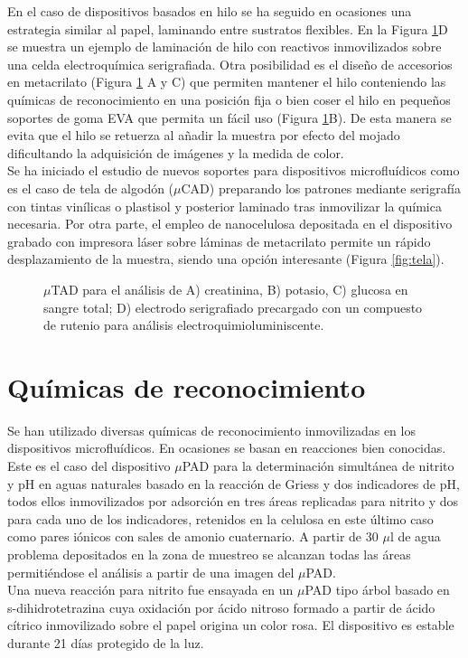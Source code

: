 \documentclass{article}
\begin{document}
En el caso de dispositivos basados en hilo se ha seguido en ocasiones una estrategia similar al papel, laminando entre sustratos flexibles. En la Figura \ref{fig:hilo}D se muestra un ejemplo de laminación de hilo con reactivos inmovilizados sobre una celda electroquímica serigrafiada. Otra posibilidad es el diseño de accesorios en metacrilato (Figura \ref{fig:hilo} A y C) que permiten mantener el hilo conteniendo las químicas de reconocimiento en una posición fija o bien coser el hilo en pequeños soportes de goma EVA que permita un fácil uso (Figura \ref{fig:hilo}B). De esta manera se evita que el hilo se retuerza al añadir la muestra por efecto del mojado dificultando la adquisición de imágenes y la medida de color.\\

Se ha iniciado el estudio de nuevos soportes para dispositivos microfluídicos como es el caso de tela de algodón ($\mu$CAD) preparando los patrones mediante serigrafía con tintas vinílicas o plastisol y posterior laminado tras inmovilizar la química necesaria. Por otra parte, el empleo de nanocelulosa depositada en el dispositivo grabado con impresora láser sobre láminas de metacrilato permite un rápido desplazamiento de la muestra, siendo una opción interesante (Figura \ref{fig:tela}).\\

\begin{figure}[h]
\caption{ $\mu$TAD para el análisis de A) creatinina, B) potasio, C) glucosa en sangre total; D) electrodo serigrafiado precargado con un compuesto de rutenio para análisis electroquimioluminiscente.}
\label{fig:hilo}
\end{figure}

\section{Químicas de reconocimiento}
Se han utilizado diversas químicas de reconocimiento inmovilizadas en los dispositivos microfluídicos. En ocasiones se basan en reacciones bien conocidas. Este es el caso del dispositivo $\mu$PAD para la determinación simultánea de nitrito y pH en aguas naturales basado en la reacción de Griess y dos indicadores de pH, todos ellos inmovilizados por adsorción en tres áreas replicadas para nitrito y dos para cada uno de los indicadores, retenidos en la celulosa en este último caso como pares iónicos con sales de amonio cuaternario. A partir de 30 $\mu$l de agua problema depositados en la zona de muestreo se alcanzan todas las áreas permitiéndose el análisis a partir de una imagen del $\mu$PAD\cite{Lopez-Ruiz2014}.\\
Una nueva reacción para nitrito fue ensayada en un $\mu$PAD tipo árbol basado en s-dihidrotetrazina cuya oxidación por ácido nitroso formado a partir de ácido cítrico inmovilizado sobre el papel origina un color rosa. El dispositivo es estable durante 21 días protegido de la luz.\\
\end{document}
